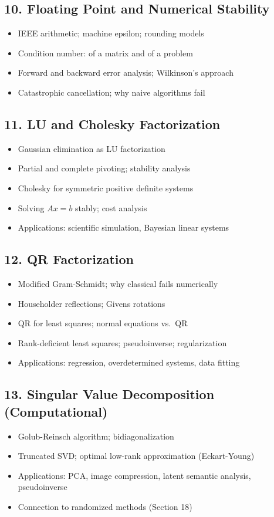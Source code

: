 \subsection{10. Floating Point and Numerical Stability}
\begin{itemize}
\item IEEE arithmetic; machine epsilon; rounding models
\item Condition number: of a matrix and of a problem
\item Forward and backward error analysis; Wilkinson's approach
\item Catastrophic cancellation; why naive algorithms fail
\end{itemize}

\subsection{11. LU and Cholesky Factorization}
\begin{itemize}
\item Gaussian elimination as LU factorization
\item Partial and complete pivoting; stability analysis
\item Cholesky for symmetric positive definite systems
\item Solving $Ax = b$ stably; cost analysis
\item Applications: scientific simulation, Bayesian linear systems
\end{itemize}

\subsection{12. QR Factorization}
\begin{itemize}
\item Modified Gram-Schmidt; why classical fails numerically
\item Householder reflections; Givens rotations
\item QR for least squares; normal equations vs.\ QR
\item Rank-deficient least squares; pseudoinverse; regularization
\item Applications: regression, overdetermined systems, data fitting
\end{itemize}

\subsection{13. Singular Value Decomposition (Computational)}
\begin{itemize}
\item Golub-Reinsch algorithm; bidiagonalization
\item Truncated SVD; optimal low-rank approximation (Eckart-Young)
\item Applications: PCA, image compression, latent semantic analysis, pseudoinverse
\item Connection to randomized methods (Section 18)
\end{itemize}

